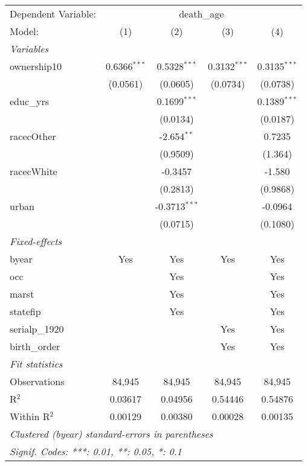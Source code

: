
\begingroup
\centering
\begin{tabular}{lcccc}
   \tabularnewline \midrule \midrule
   Dependent Variable: & \multicolumn{4}{c}{death\_age}\\
   Model:         & (1)            & (2)             & (3)            & (4)\\  
   \midrule
   \emph{Variables}\\
   ownership10    & 0.6366$^{***}$ & 0.5328$^{***}$  & 0.3132$^{***}$ & 0.3135$^{***}$\\   
                  & (0.0561)       & (0.0605)        & (0.0734)       & (0.0738)\\   
   educ\_yrs      &                & 0.1699$^{***}$  &                & 0.1389$^{***}$\\   
                  &                & (0.0134)        &                & (0.0187)\\   
   racecOther     &                & -2.654$^{**}$   &                & 0.7235\\   
                  &                & (0.9509)        &                & (1.364)\\   
   racecWhite     &                & -0.3457         &                & -1.580\\   
                  &                & (0.2813)        &                & (0.9868)\\   
   urban          &                & -0.3713$^{***}$ &                & -0.0964\\   
                  &                & (0.0715)        &                & (0.1080)\\   
   \midrule
   \emph{Fixed-effects}\\
   byear          & Yes            & Yes             & Yes            & Yes\\  
   occ            &                & Yes             &                & Yes\\  
   marst          &                & Yes             &                & Yes\\  
   statefip       &                & Yes             &                & Yes\\  
   serialp\_1920  &                &                 & Yes            & Yes\\  
   birth\_order   &                &                 & Yes            & Yes\\  
   \midrule
   \emph{Fit statistics}\\
   Observations   & 84,945         & 84,945          & 84,945         & 84,945\\  
   R$^2$          & 0.03617        & 0.04956         & 0.54446        & 0.54876\\  
   Within R$^2$   & 0.00129        & 0.00380         & 0.00028        & 0.00135\\  
   \midrule \midrule
   \multicolumn{5}{l}{\emph{Clustered (byear) standard-errors in parentheses}}\\
   \multicolumn{5}{l}{\emph{Signif. Codes: ***: 0.01, **: 0.05, *: 0.1}}\\
\end{tabular}
\par\endgroup


